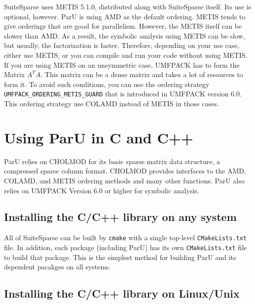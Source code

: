 \documentclass[12pt]{article}
\begin{document}
SuiteSparse uses METIS 5.1.0, distributed along with SuiteSparse itself.
Its use is optional, however. ParU is using AMD as the default ordering. METIS
tends to give orderings that are good for parallelism. However, the METIS itself
can be slower than AMD. As a result, the symbolic analysis using METIS can be slow, but
usually, the factorization is faster. Therefore, depending on your use case,
either use METIS, or you can compile and run your code without using METIS.
If you are using METIS on an unsymmetric case, UMFPACK has to form the Matrix
$A^{T}A$. This matrix can be a dense matrix and takes a lot of resources to form
it. To avoid such conditions, you can use the ordering strategy
\verb'UMFPACK_ORDERING_METIS_GUARD' that is introduced in UMFPACK version 6.0.
This ordering strategy use COLAMD instead of METIS in those cases.

\section{Using ParU in C and C++}

ParU relies on CHOLMOD for its basic sparse matrix data structure, a compressed
sparse column format.  CHOLMOD provides interfaces to the AMD, COLAMD, and METIS
ordering methods and many other functions. ParU also relies on UMFPACK Version
6.0 or higher for symbolic analysis.

\subsection{Installing the C/C++ library on any system}

All of SuiteSparse can be built by \verb'cmake' with a single
top-level \verb'CMakeLists.txt' file.  In addition, each package (including
ParU) has its own \verb'CMakeLists.txt' file to build that package.
This is the simplest method for building ParU and its dependent pacakges
on all systems.

\subsection{Installing the C/C++ library on Linux/Unix}
\end{document}
